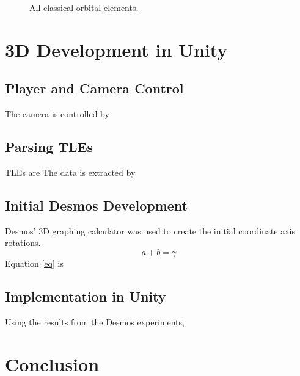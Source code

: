 \documentclass[conference]{IEEEtran}
\makeatletter
\newcommand*{\overrightharpoonup}{\mathpalette{\overarrow@\rightharpoonupfill@}}
\newcommand*{\rightharpoonupfill@}{\arrowfill@\relbar\relbar\rightharpoonup}
\renewcommand{\vec}[1]{\overrightharpoonup{\bm{\mathrm{#1}}}}
\makeatother
\begin{document}
\begin{figure}[hbtp]
\begin{center}
				\end{center}
				\caption{All classical orbital elements.}
				\label{figG}
			\end{figure}

	\section{3D Development in Unity}

		\subsection{Player and Camera Control}
			The camera is controlled by

		\subsection{Parsing TLEs}
			TLEs are 
			The data is extracted by

		\subsection{Initial Desmos Development}
			Desmos' 3D graphing calculator was used to create the initial coordinate axis rotations.
			\begin{equation}
				a+b=\gamma\label{eq}
			\end{equation}
			Equation \eqref{eq} is

		\subsection{Implementation in Unity}
			Using the results from the Desmos experiments, 

	\section{Conclusion}
\end{document}
